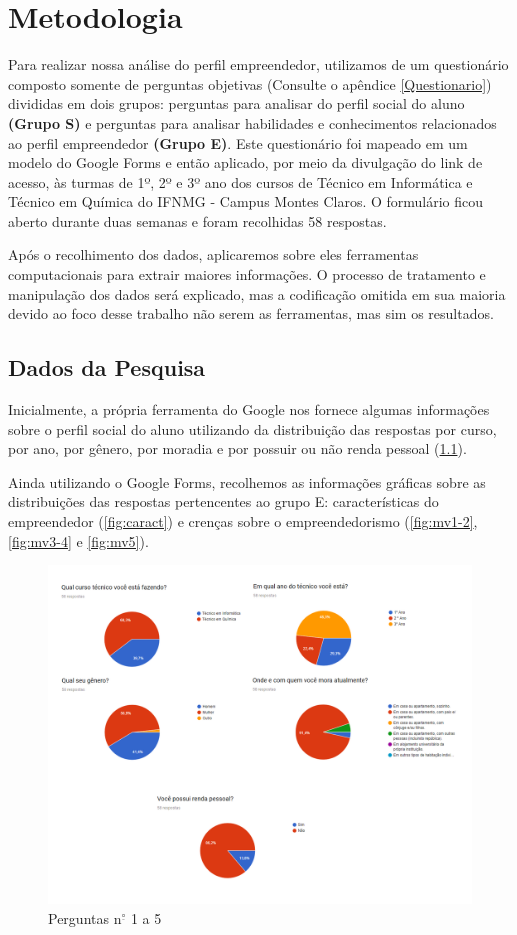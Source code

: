 \chapter{Metodologia}\label{capitulo2}

Para realizar nossa análise do perfil empreendedor, utilizamos de um questionário composto somente de perguntas objetivas (Consulte o apêndice \ref{Questionario}) divididas em dois grupos: perguntas para analisar do perfil social do aluno \textbf{(Grupo S)} e perguntas para analisar habilidades e conhecimentos relacionados ao perfil empreendedor \textbf{(Grupo E)}. Este questionário foi mapeado em um modelo do Google Forms e então aplicado, por meio da divulgação do link de acesso, às turmas de 1º, 2º e 3º ano dos cursos de Técnico em Informática e Técnico em Química do IFNMG - Campus Montes Claros. O formulário ficou aberto durante duas semanas e foram recolhidas 58 respostas.

Após o recolhimento dos dados, aplicaremos sobre eles ferramentas computacionais para extrair maiores informações. O processo de tratamento e manipulação dos dados será explicado, mas a codificação omitida em sua maioria devido ao foco desse trabalho não serem as ferramentas, mas sim os resultados.

\section{Dados da Pesquisa}
Inicialmente, a própria ferramenta do Google nos fornece algumas informações sobre o perfil social do aluno utilizando da distribuição das respostas por curso, por ano, por gênero, por moradia e por possuir ou não renda pessoal (\ref{fig:quest1-5}).

Ainda utilizando o Google Forms, recolhemos as informações gráficas sobre as distribuições das respostas pertencentes ao grupo E: características do empreendedor (\ref{fig:caract}) e crenças sobre o empreendedorismo (\ref{fig:mv1-2}, \ref{fig:mv3-4} e \ref{fig:mv5}).

\begin{figure}[!h]
    \centering
    \includegraphics[width=1.0\textwidth]{img/quest1-5.png}
    \caption{Perguntas n$^{\underline{\circ}}$ 1 a 5}
    \label{fig:quest1-5}
\end{figure}

